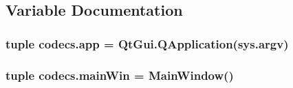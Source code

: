 \subsection{Variable Documentation}
\hypertarget{namespacecodecs_a9829c09acc5ce3bef5c122c5733c013e}{}
\subsubsection[{app}]{\setlength{\rightskip}{0pt plus 5cm}tuple codecs.\+app = Qt\+Gui.\+Q\+Application(sys.\+argv)}\label{namespacecodecs_a9829c09acc5ce3bef5c122c5733c013e}
\hypertarget{namespacecodecs_ae00a81b94d19bef383a811cae55b57c2}{}
\subsubsection[{main\+Win}]{\setlength{\rightskip}{0pt plus 5cm}tuple codecs.\+main\+Win = {\bf Main\+Window}()}\label{namespacecodecs_ae00a81b94d19bef383a811cae55b57c2}
